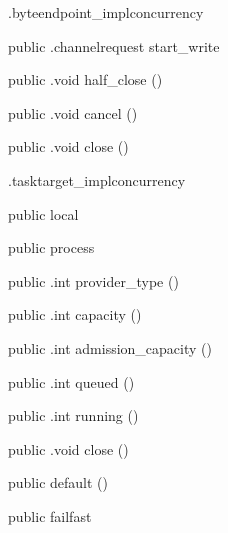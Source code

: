 \begin{CrexxClass}{.byteendpoint\_impl}{concurrency}
\begin{Members}
    \Method
      {public}
      {.channelrequest}
      {start\_write}
      {}

    \Method
      {public}
      {.void}
      {half\_close}
      {()}

    \Method
      {public}
      {.void}
      {cancel}
      {()}

    \Method
      {public}
      {.void}
      {close}
      {()}

  \end{Members}
\end{CrexxClass}

\begin{CrexxClass}{.tasktarget\_impl}{concurrency}

  \begin{Hierarchy}
  \end{Hierarchy}

  \begin{Members}

    \Factory
      {public}
      {local}
      {}

    \Factory
      {public}
      {process}
      {}

    \Method
      {public}
      {.int}
      {provider\_type}
      {()}

    \Method
      {public}
      {.int}
      {capacity}
      {()}

    \Method
      {public}
      {.int}
      {admission\_capacity}
      {()}

    \Method
      {public}
      {.int}
      {queued}
      {()}

    \Method
      {public}
      {.int}
      {running}
      {()}

    \Method
      {public}
      {.void}
      {close}
      {()}

    \Factory
      {public}
      {default}
      {()}

    \Factory
      {public}
      {failfast}
      {}


\end{Members}
\end{CrexxClass}
